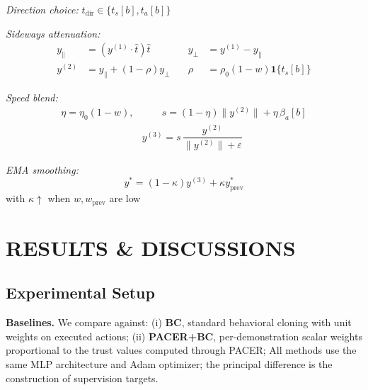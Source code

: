 \documentclass[a4paper, 10pt, conference]{ieeeconf}
\begin{document}
\begin{algorithm}[p]
{        \textit{Direction choice:}
        $t_{\mathrm{dir}}\in\{t_s[b],t_a[b]\}$

        \textit{Sideways attenuation:}
        \begin{equation*}
            \begin{aligned}
                y_\parallel&=(y^{(1)}\!\cdot\! \hat t)\hat t
                &\quad
                y_\perp&=y^{(1)}-y_\parallel
                \\
                y^{(2)}&=
                y_\parallel+(1-\rho)y_\perp
                &\quad
                \rho&=\rho_0(1-w)\mathbf{1}\{t_s[b]\}
            \end{aligned}
        \end{equation*}

        \textit{Speed blend:}
        \begin{equation*}
            \begin{aligned}
                \eta=\eta_0(1-w),
                &\qquad
                s=
                (1-\eta)\|y^{(2)}\|
                +\eta\,\beta_a[b]
                \\
                & y^{(3)}=
                s\,
                \dfrac{y^{(2)}}{\|y^{(2)}\|+\varepsilon}
            \end{aligned}
        \end{equation*}

        \textit{EMA smoothing:}
        \begin{equation*}
            y^*=
            (1-\kappa)y^{(3)}
            +\kappa y^*_{\text{prev}}
        \end{equation*}
        with $\kappa\uparrow$ when
        $w,w_{\text{prev}}$ are low

    }

\end{algorithm}

\section{RESULTS \& DISCUSSIONS}

\subsection{Experimental Setup}

\textbf{Baselines.} We compare against:
(i) \textbf{BC}, standard behavioral cloning with unit weights on executed actions;
(ii) \textbf{PACER+BC}, per-demonstration scalar weights proportional to the trust values computed through PACER;
All methods use the same MLP architecture and Adam optimizer; the principal difference is the construction of supervision targets.
\end{document}
